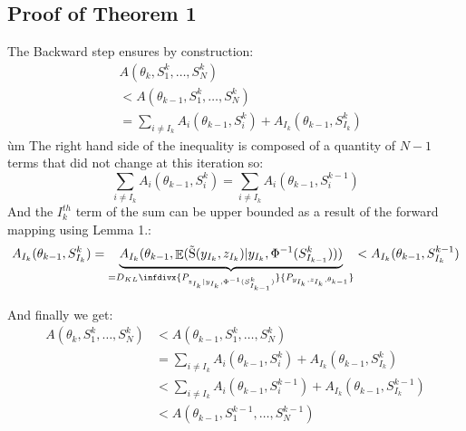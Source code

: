 \documentclass{article}
\theoremstyle{plain}
\DeclareMathOperator*{\E}{\mathbb{E}}
\DeclareMathOperator*{\St}{\tilde{S}}
\theoremstyle{plain}
\theoremstyle{definition}
\newcommand{\infdiv}{D_{KL}\infdivx}
\begin{document}

\newpage

\newpage
\begin{appendices}
\section{Proof of Theorem 1}
The Backward step ensures by construction:
\begin{equation}
\begin{split}
& A(\theta_{k},S_1^k,\dots,S_N^k) \\
& < A(\theta_{k-1},S_1^k,\dots,S_N^k)\\
& = \sum_{i \neq I_{k}}{A_i(\theta_{k-1},S_i^k)} + A_{I_{k}}(\theta_{k-1},S_{I_{k}}^k)
\end{split}
\end{equation}ùm
The right hand side of the inequality is composed of a quantity of $N-1$ terms that did not change at this iteration so:
\begin{equation}
\sum_{i \neq I_{k}}{A_i(\theta_{k-1},S_i^k)}  = \sum_{i \neq I_{k}}{A_i(\theta_{k-1},S_i^{k-1})}
\end{equation}
\noindent And the $I_{k}^{th}$ term of the sum can be upper bounded as a result of the forward mapping using Lemma 1.:
\begin{equation}
A_{I_{k}}(\theta_{k-1},S_{I_{k}}^k) = \underbrace{A_{I_{k}}(\theta_{k-1},\E(\St(y_{I_{k}},z_{I_{k}})|y_{I_{k}},\Phi^{-1}(S_{I_{k-1}}^k)))}_{= \infdiv{P_{z_{I_{k}}|y_{I_{k}},\Phi^{-1}(S_{I_{k-1}}^{k})}}{P_{y_{I_{k}},z_{I_{k}},\theta_{k-1}}}}  < A_{I_{k}}(\theta_{k-1},S_{I_{k}}^{k-1})
\end{equation}

\noindent And finally we get:
\begin{equation}
\begin{split}
A(\theta_{k},S_1^k,\dots,S_N^k) & < A(\theta_{k-1},S_1^k,\dots,S_N^k)\\
& = \sum_{i \neq I_{k}}{A_i(\theta_{k-1},S_i^k)} + A_{I_{k}}(\theta_{k-1},S_{I_{k}}^k)\\
& < \sum_{i \neq I_{k}}{A_i(\theta_{k-1},S_i^{k-1})} + A_{I_{k}}(\theta_{k-1},S_{I_{k}}^{k-1})\\
& < A(\theta_{k-1},S_1^{k-1},\dots,S_N^{k-1})
\end{split}
\end{equation}



\end{appendices}
\end{document}
